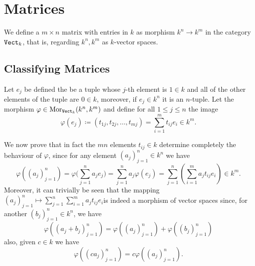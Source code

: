 \section{Matrices}

\begin{definition}[Matrix]
    We define a \(m \times n\) matrix with entries in \(k\) as morphism \(k^n \to
    k^m\) in the category \({\texttt{Vect}}_k\), that is, regarding \(k^n, k^m\) as
    \(k\)-vector spaces.
\end{definition}

\subsection{Classifying Matrices}

Let \(e_j\) be defined the be a tuple whose \(j\)-th element is \(1 \in k\) and
all of the other elements of the tuple are \(0 \in k\), moreover, if \(e_j \in
k^n\) it is an \(n\)-tuple. Let the morphism \(\varphi \in \operatorname{Mor}_{{\texttt{Vect}}_k}
(k^n, k^m)\) and define for all \(1 \leq j \leq n\) the image
\[
    \varphi(e_j) \coloneq (t_{1 j}, t_{2 j}, \dots, t_{mj}) = \sum_{i = 1}^m t_{ij} e_i
    \in k^m.
\]

We now prove that in fact the \(mn\) elements \(t_{ij} \in k\) determine
completely the behaviour of \(\varphi\), since for any element \((a_j)_{j=1}^n
\in k^n\) we have
\[
    \varphi((a_j)_{j=1}^n) = \varphi \Bigg( \sum_{j=1}^n a_j e_j \Bigg) =
    \sum_{j=1}^n a_j \varphi(e_j) = \sum_{j=1}^n \left( \sum_{i=1}^m a_j t_{i j}
    e_i\right) \in k^m.
\]
Moreover, it can trivially be seen that the mapping \((a_j)_{j=1}^n \mapsto
\sum_{j=1}^n \sum_{i=1}^m a_j t_{ij} e_i\)is indeed a morphism of vector
spaces since, for another \((b_j)_{j=1}^n \in k^n\), we have
\[
    \varphi((a_j + b_j)_{j=1}^n) = \varphi((a_j)_{j=1}^n) +
    \varphi((b_j)_{j=1}^n)
\]
also, given \(c \in k\) we have
\[
    \varphi((c a_j)_{j=1}^n) = c\varphi((a_j)_{j=1}^n).
\]

